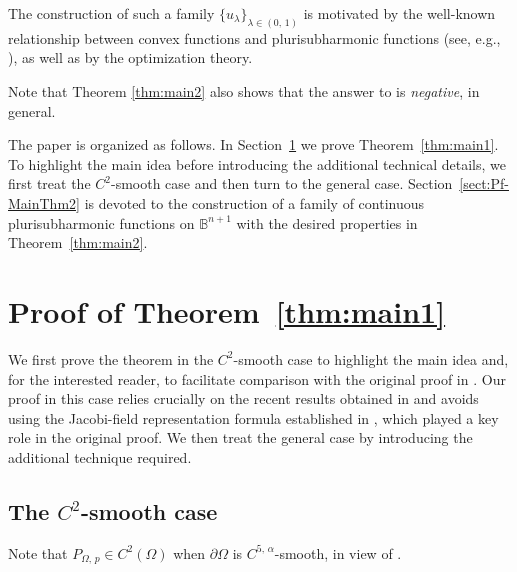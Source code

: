 \documentclass[12pt,a4paper]{amsart}
\numberwithin{equation}{section}
\theoremstyle{definition}
\begin{document}
The construction of such a family $\{u_{\lambda}\}_{\lambda\in(0,\, 1)}$ is motivated by the well-known relationship between convex functions and
plurisubharmonic functions (see, e.g., \cite[Chapter I]{Demaillybook}),  as well as by the optimization theory.


Note that Theorem \ref{thm:main2} also shows that the answer to \cite[Question 7.6]{Bracci-Trans09} is {\it negative}, in general.


The paper is organized as follows. In Section~\ref{sect:Pf-MainThm1} we prove Theorem~\ref{thm:main1}. To highlight the main idea before
introducing the additional technical details, we first treat the
$C^2$-smooth case and then turn to the general case.
Section~\ref{sect:Pf-MainThm2} is devoted to the construction of a family of continuous plurisubharmonic functions on  $\mathbb B^{n+1}$ with the desired properties in Theorem~\ref{thm:main2}.



\section{Proof of Theorem~\ref{thm:main1}}\label{sect:Pf-MainThm1}
We first prove the theorem in the $C^2$-smooth case to highlight the main idea and, for the interested reader, to facilitate comparison with the original proof in \cite{Bracci-Trans09}.  Our proof in this case relies crucially on the recent results obtained in \cite{Huang-Wang22, Wang24} and avoids using the
Jacobi-field representation formula established in \cite{S-Trapani_JGA02}, which played a key role in the original proof. We then treat the general case by introducing the additional technique required.



\subsection{The $C^2$-smooth case}
Note that $P_{\Omega,\,p}\in C^2(\Omega)$ when $\partial\Omega$ is $C^{5,\,\alpha}$-smooth, in view of \cite[Theorem D]{Wang24}.
\end{document}
